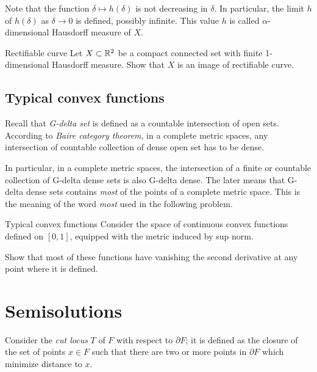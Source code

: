 Note that the function $\delta\mapsto h(\delta)$ is not decreasing in $\delta$.
In particular, the limit $h$ of $h(\delta)$ as $\delta\to0$ is defined, possibly infinite.
This value $h$ is called $\alpha$-dimensional Hausdorff measure of $X$.

\begin{pr}{}{Rectifiable curve}\label{Rectifiable curve}
Let $X\subset \mathbb{R}^2$ be a compact connected set
with finite 1-dimensional Hausdorff measure. 
Show that $X$ is an image of rectifiable curve.
\end{pr}

\subsection*{Typical convex functions}

Recall that \emph{G-delta set} is defined as a countable intersection of open sets.
According to \emph{Baire category theorem}, 
in a complete metric spaces,
any intersection of countable collection of dense open set 
has to be dense.

In particular, in a complete metric spaces, 
the intersection of a finite or countable collection of G-delta dense sets is also G-delta dense. 
The later means that G-delta dense sets contains {}\emph{most} of the points of a complete metric space. 
This is the meaning of the word {}\emph{most} used in the following problem.

\begin{pr}{\easy}{Typical convex functions}\label{Most of the convex functions}
Consider the space of continuous convex functions defined on $[0,1]$,
equipped with the metric induced by sup norm.

Show that most of these functions have vanishing the second derivative at any point where it is defined.
\end{pr}


\section*{Semisolutions}


Consider the {\it cut locus} $T$
of $F$ with respect to $\partial F$;
it is defined as the closure
of the set of points $x\in F$ 
such that there are two or more points in $\partial F$ which minimize distance to $x$.

